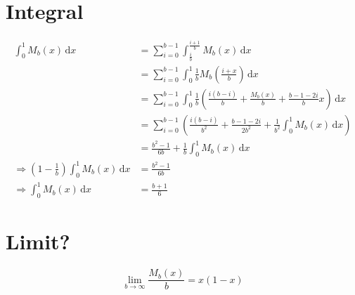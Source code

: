 \documentclass[]{article}
\newcommand{\ud}{\mathrm{d}}
\begin{document}
\section{Integral}
\begin{align*}
\int_0^1 M_b(x)\,\ud x &= \sum_{i=0}^{b-1}\int_{\frac{i}{b}}^{\frac{i+1}{b}} M_b(x)\,\ud x\\
&=\sum_{i=0}^{b-1}\int_{0}^{1} \frac{1}{b}M_b\left(\frac{i+x}{b}\right)\,\ud x\\
&=\sum_{i=0}^{b-1}\int_{0}^{1} \frac{1}{b}\left(\frac{i(b-i)}{b} + \frac{M_b(x)}{b} + \frac{b-1-2i}{b} x\right)\,\ud x\\
&=\sum_{i=0}^{b-1}\left(\frac{i(b-i)}{b^2}  + \frac{b-1-2i}{2b^2} +  \frac{1}{b^2}\int_{0}^{1} M_b(x)\,\ud x\right)\\
&=\frac{b^2-1}{6b} + \frac{1}{b}\int_{0}^{1} M_b(x)\,\ud x\\
\Rightarrow \left(1-\frac{1}{b}\right)\int_0^1 M_b(x)\,\ud x &= \frac{b^2-1}{6b}\\
\Rightarrow \int_0^1 M_b(x)\,\ud x &= \frac{b+1}{6}
\end{align*}





\section{Limit?}

\[
\lim_{b\to\infty}\frac{M_b(x)}{b} = x(1-x)
\]
\end{document}

